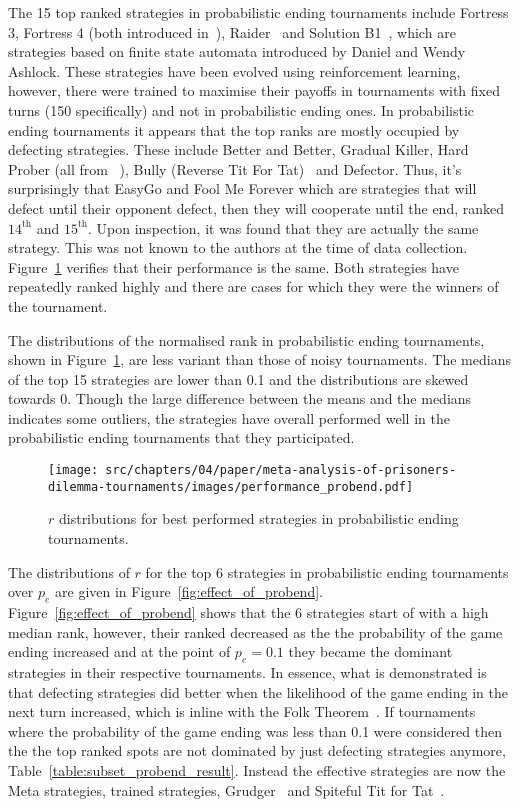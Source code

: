 The 15 top ranked strategies in probabilistic ending tournaments include
Fortress 3, Fortress 4 (both introduced in~\cite{Ashlock2006}),
Raider~\cite{Ashlock2014} and Solution B1~\cite{Ashlock2014}, which are
strategies based on finite state automata introduced by Daniel and Wendy
Ashlock. These strategies have been evolved using reinforcement learning, however,
there were trained to maximise their payoffs in tournaments with fixed turns
(150 specifically) and not in probabilistic ending ones. In probabilistic ending
tournaments it appears that the top ranks are mostly occupied by defecting
strategies. These include Better and Better, Gradual Killer, Hard Prober (all
from ~\cite{prison}), Bully (Reverse Tit For Tat)~\cite{Nachbar1992} and
Defector. Thus, it's surprisingly that EasyGo and Fool Me Forever which are
strategies that will defect until their opponent defect, then they will cooperate
until the end, ranked $14^{\text{th}}$ and $15^{\text{th}}$. Upon inspection,
it was found that they are actually the same strategy. This was not known to
the authors at the time of data collection. Figure~\ref{fig:probend_results}
verifies that their performance is the same. Both strategies have repeatedly
ranked highly and there are cases for which they were the winners of the
tournament.

The distributions of the normalised rank in probabilistic ending tournaments,
shown in
Figure~\ref{fig:probend_results}, are less variant than those of noisy
tournaments. The medians of the top 15 strategies are lower than 0.1 and the distributions are skewed
towards 0. Though the large difference between the means and the medians
indicates some outliers, the strategies have overall performed well in the
probabilistic ending tournaments that they participated.

\begin{figure}[h!]
    \centering
    \texttt{[image: src/chapters/04/paper/meta-analysis-of-prisoners-dilemma-tournaments/images/performance\_probend.pdf]}
    \caption{\(r\) distributions for best performed strategies in probabilistic ending tournaments.}
    \label{fig:probend_results}
\end{figure}

The distributions of \(r\) for the top 6 strategies in probabilistic ending
tournaments over \(p_e\) are given in Figure~\ref{fig:effect_of_probend}.
Figure~\ref{fig:effect_of_probend} shows that the 6 strategies start of with a
high median rank, however, their ranked decreased as the the probability of the
game ending increased and at the point of \(p_e=0.1\) they became the dominant
strategies in their respective tournaments. In essence, what is demonstrated is
that defecting strategies did better when the likelihood of the game ending in
the next turn increased, which is inline with the Folk
Theorem~\cite{Fudenberg2009}. If tournaments where the probability of the game
ending was less than 0.1 were considered then the the top ranked spots are not
dominated by just defecting strategies anymore,
Table~\ref{table:subset_probend_result}. Instead the effective strategies are
now the Meta strategies, trained strategies, Grudger~\cite{axelrodproject} and
Spiteful Tit for Tat~\cite{prison}.

